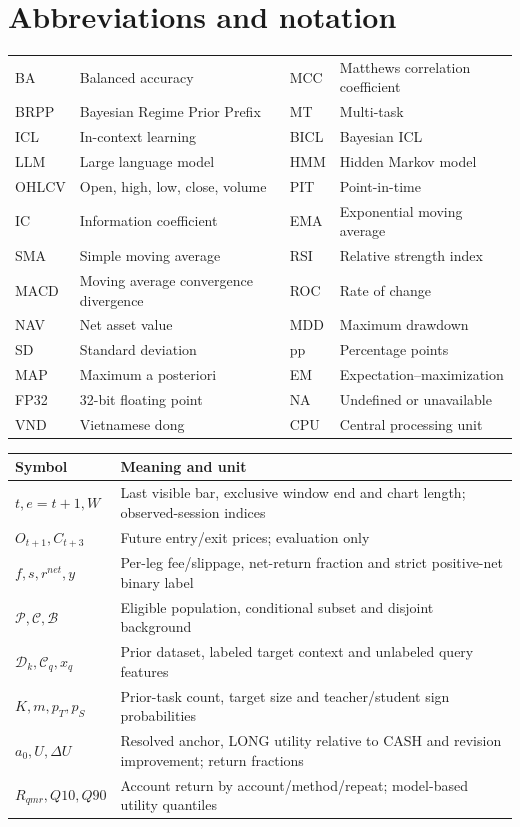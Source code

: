 \chapter*{Abbreviations and notation}
\begingroup\small{}
\begin{tabular}{@{}P{.13\linewidth}P{.32\linewidth}P{.12\linewidth}P{.32\linewidth}@{}}\toprule
BA & Balanced accuracy & MCC & Matthews correlation coefficient\\
BRPP & Bayesian Regime Prior Prefix & MT & Multi-task\\
ICL & In-context learning & BICL & Bayesian ICL\\
LLM & Large language model & HMM & Hidden Markov model\\
OHLCV & Open, high, low, close, volume & PIT & Point-in-time\\
IC & Information coefficient & EMA & Exponential moving average\\
SMA & Simple moving average & RSI & Relative strength index\\
MACD & Moving average convergence divergence & ROC & Rate of change\\
NAV & Net asset value & MDD & Maximum drawdown\\
SD & Standard deviation & pp & Percentage points\\
MAP & Maximum a posteriori & EM & Expectation--maximization\\
FP32 & 32-bit floating point & NA & Undefined or unavailable\\
VND & Vietnamese dong & CPU & Central processing unit\\\bottomrule
\end{tabular}
\medskip

\begin{tabular}{@{}p{.23\linewidth}p{.70\linewidth}@{}}\toprule
Symbol & Meaning and unit\\\midrule
$t,e=t+1,W$ & Last visible bar, exclusive window end and chart length; observed-session indices\\
$O_{t+1},C_{t+3}$ & Future entry/exit prices; evaluation only\\
$f,s,r^{net},y$ & Per-leg fee/slippage, net-return fraction and strict positive-net binary label\\
$\mathcal P,\mathcal C,\mathcal B$ & Eligible population, conditional subset and disjoint background\\
$\mathcal D_k,\mathcal C_q,x_q$ & Prior dataset, labeled target context and unlabeled query features\\
$K,m,p_T,p_S$ & Prior-task count, target size and teacher/student sign probabilities\\
$a_0,U,\Delta U$ & Resolved anchor, LONG utility relative to CASH and revision improvement; return fractions\\
$R_{qmr},Q10,Q90$ & Account return by account/method/repeat; model-based utility quantiles\\\bottomrule
\end{tabular}
\endgroup

